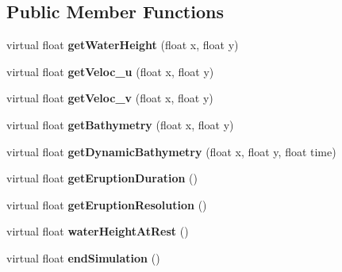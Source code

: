 \subsection*{Public Member Functions}
\begin{DoxyCompactItemize}
\item 
\hypertarget{classSWE__Scenario_ade6f356d60b1402c034611266462b88b}{virtual float {\bfseries get\-Water\-Height} (float x, float y)}\label{classSWE__Scenario_ade6f356d60b1402c034611266462b88b}

\item 
\hypertarget{classSWE__Scenario_ab1d5e360c861df3c8c0ccd919bd7f495}{virtual float {\bfseries get\-Veloc\-\_\-u} (float x, float y)}\label{classSWE__Scenario_ab1d5e360c861df3c8c0ccd919bd7f495}

\item 
\hypertarget{classSWE__Scenario_afeaf75872a1678ea64e6f7accd1e49c6}{virtual float {\bfseries get\-Veloc\-\_\-v} (float x, float y)}\label{classSWE__Scenario_afeaf75872a1678ea64e6f7accd1e49c6}

\item 
\hypertarget{classSWE__Scenario_afe09a1ba63304800651f25873570a348}{virtual float {\bfseries get\-Bathymetry} (float x, float y)}\label{classSWE__Scenario_afe09a1ba63304800651f25873570a348}

\item 
\hypertarget{classSWE__Scenario_adbf35863dd7eb914b2f32c208c6669fd}{virtual float {\bfseries get\-Dynamic\-Bathymetry} (float x, float y, float time)}\label{classSWE__Scenario_adbf35863dd7eb914b2f32c208c6669fd}

\item 
\hypertarget{classSWE__Scenario_a6a2a9a139b471a20a66b2b1a52b9d820}{virtual float {\bfseries get\-Eruption\-Duration} ()}\label{classSWE__Scenario_a6a2a9a139b471a20a66b2b1a52b9d820}

\item 
\hypertarget{classSWE__Scenario_ad31c352fd69146366191fe3598a22d28}{virtual float {\bfseries get\-Eruption\-Resolution} ()}\label{classSWE__Scenario_ad31c352fd69146366191fe3598a22d28}

\item 
\hypertarget{classSWE__Scenario_a9de0f0f9fcc34dfe00c522b10c343d91}{virtual float {\bfseries water\-Height\-At\-Rest} ()}\label{classSWE__Scenario_a9de0f0f9fcc34dfe00c522b10c343d91}

\item 
\hypertarget{classSWE__Scenario_ae7ed72f584069e9885c33c4ca83f3ff5}{virtual float {\bfseries end\-Simulation} ()}\label{classSWE__Scenario_ae7ed72f584069e9885c33c4ca83f3ff5}


\end{DoxyCompactItemize}
